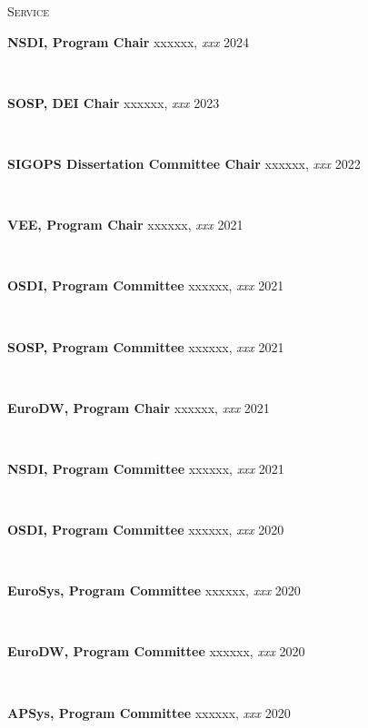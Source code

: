 \documentclass[10pt,times]{report}
\newlength{\sectiongap}
\newlength{\entrygap}
\newlength{\sectioncolwidth}
\newlength{\colgap}
\newlength{\stuffwidth}
\def\ifEqString#1#2{\def\testa{#1}\def\testb{#2}%
  \ifx\testa\testb}
\newenvironment{rtable}{
  \begin{minipage}{\textwidth}
  }{
  \end{minipage}
}
\newenvironment{rentry}[3][xxx]{
  \begin{minipage}[t]{\hsize}
    \textbf{#2}\ifEqString{#1}{xxx}\relax\else, \textit{#1}\fi
    \hspace{\stretch{1}} #3 \\
  }{
    \removelastskip
  \end{minipage}
  \\[\entrygap]  %
}
\newenvironment{rsection}[1]{
  \begin{minipage}[t]{\sectioncolwidth}
    \textsc{#1}
  \end{minipage}
  \hspace{\colgap}
  \begin{minipage}[t]{\stuffwidth}
  }{
    \removelastskip
  \end{minipage}
  \\[\sectiongap]
}
\begin{document}
\begin{rtable}

  \begin{rsection}{Service}
    \begin{rentry}{NSDI, Program Chair}{2024}
      \vspace{-0.5em}
    \end{rentry}
    \begin{rentry}{SOSP, DEI Chair}{2023}
      \vspace{-0.5em}
    \end{rentry}
    \begin{rentry}{SIGOPS Dissertation Committee Chair}{2022}
      \vspace{-0.5em}
    \end{rentry}
    \begin{rentry}{VEE, Program Chair}{2021}
      \vspace{-0.5em}
    \end{rentry}
    \begin{rentry}{OSDI, Program Committee}{2021}
      \vspace{-0.5em}
    \end{rentry}
    \begin{rentry}{SOSP, Program Committee}{2021}
      \vspace{-0.5em}
    \end{rentry}
    \begin{rentry}{EuroDW, Program Chair}{2021}
      \vspace{-0.5em}
    \end{rentry}
    \begin{rentry}{NSDI, Program Committee}{2021}
      \vspace{-0.5em}
    \end{rentry}
    \begin{rentry}{OSDI, Program Committee}{2020}
      \vspace{-0.5em}
    \end{rentry}
    \begin{rentry}{EuroSys, Program Committee}{2020}
       \vspace{-0.5em}
    \end{rentry}
    \begin{rentry}{EuroDW, Program Committee}{2020}
       \vspace{-0.5em}
    \end{rentry}
    \begin{rentry}{APSys, Program Committee}{2020}
       \vspace{-0.5em}

\end{rentry}
\end{rsection}
\end{rtable}
\end{document}
